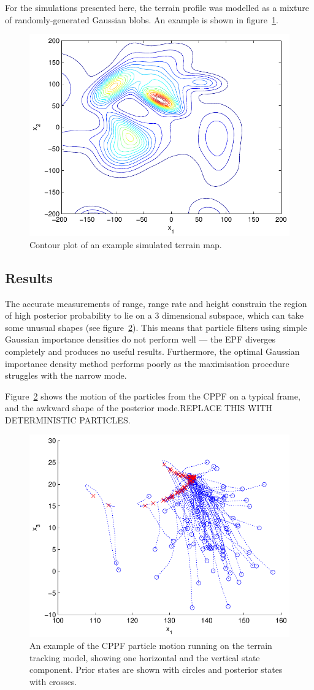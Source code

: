 \documentclass[conference]{IEEEtran}
\begin{document}
For the simulations presented here, the terrain profile was modelled as a mixture of randomly-generated Gaussian blobs. An example is shown in figure~\ref{fig:drone_terrain_map}.
%
\begin{figure}
\centering
\includegraphics[width=0.7\columnwidth]{drone_terrain_map.pdf}
\caption{Contour plot of an example simulated terrain map.}
\label{fig:drone_terrain_map}
\end{figure}

\subsection{Results}

The accurate measurements of range, range rate and height constrain the region of high posterior probability to lie on a $3$ dimensional subspace, which can take some unusual shapes (see figure~\ref{fig:drone_example_frame}). This means that particle filters using simple Gaussian importance densities do not perform well --- the EPF diverges completely and produces no useful results. Furthermore, the optimal Gaussian importance density method performs poorly as the maximisation procedure struggles with the narrow mode.

Figure~\ref{fig:drone_example_frame} shows the motion of the particles from the CPPF on a typical frame, and the awkward shape of the posterior mode.{\meta REPLACE THIS WITH DETERMINISTIC PARTICLES.}
%
\begin{figure}
\centering
\includegraphics[width=0.7\columnwidth]{drone_example_frame.pdf}
\caption{An example of the CPPF particle motion running on the terrain tracking model, showing one horizontal and the vertical state component. Prior states are shown with circles and posterior states with crosses.}
\label{fig:drone_example_frame}
\end{figure}
\end{document}
